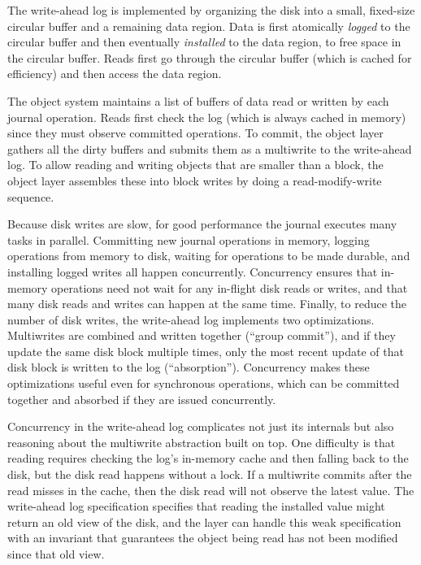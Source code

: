 The write-ahead log is implemented by organizing the disk into a small,
fixed-size circular buffer and a remaining data region. Data is first atomically
\emph{logged} to the circular buffer and then eventually \emph{installed}
to the data region, to free space in the circular buffer. Reads first go through
the circular buffer (which is cached for efficiency) and then access the data
region.

The object system maintains a list of buffers of data read or written by each journal operation.
Reads first check the log (which is always cached in memory) since
they must observe committed operations. To commit, the object
layer gathers all the dirty buffers and submits them as a multiwrite to the
write-ahead log. To allow reading and writing objects that are smaller than a
block, the object layer assembles these into block writes by doing a
read-modify-write sequence.

Because disk writes are slow, for good performance the journal executes many
tasks in parallel. Committing new journal operations in memory, logging operations
from memory to disk, waiting for operations to be made durable, and
installing logged writes all happen concurrently.  Concurrency ensures that
in-memory operations
need not wait for any in-flight disk reads or writes, and that many
disk reads and writes can happen at the same time.  Finally, to reduce the
number of disk writes, the write-ahead log implements two optimizations.
Multiwrites are combined and written
together (``group commit''), and if they update the same disk
block multiple times, only the most recent update of that disk block is
written to the log (``absorption''). Concurrency makes these optimizations
useful even for synchronous operations, which can be committed together and
absorbed if they are issued concurrently.

Concurrency in the write-ahead log complicates not just its internals but also
reasoning about the multiwrite abstraction built on top. One difficulty is that
reading requires checking the log's in-memory cache and then falling back to the disk,
but the disk read happens without a lock. If a multiwrite commits after the read
misses in the cache, then the disk read will not observe the latest value. The
write-ahead log specification specifies that reading the installed value might return an
old view of the disk, and the  layer can handle this weak specification with
an invariant that guarantees the object being read has not been modified since
that old view.

